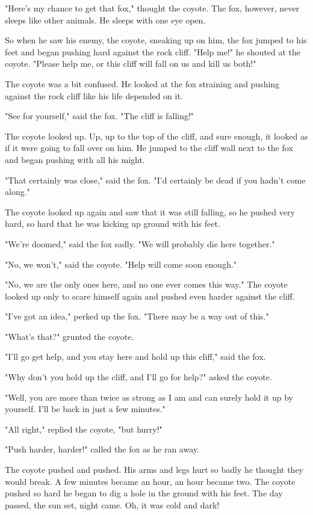 "Here's my chance to get that fox," thought the coyote. The fox, however, never sleeps like other animals. He sleeps with one eye open.

So when he saw his enemy, the coyote, sneaking up on him, the fox jumped to his feet and began pushing hard against the rock cliff. "Help me!" he shouted at the coyote. "Please help me, or this cliff will fall on us and kill us both!"

The coyote was a bit confused. He looked at the fox straining and pushing against the rock cliff like his life depended on it.

"See for yourself," said the fox. "The cliff is falling!"

The coyote looked up. Up, up to the top of the cliff, and sure enough, it looked as if it were going to fall over on him. He jumped to the cliff wall next to the fox and began pushing with all his might.

"That certainly was close," said the fox. "I'd certainly be dead if you hadn't come along."

The coyote looked up again and saw that it was still falling, so he pushed very hard, so hard that he was kicking up ground with his feet.

"We're doomed," said the fox sadly. "We will probably die here together."

"No, we won't," said the coyote. "Help will come soon enough."

"No, we are the only ones here, and no one ever comes this way." The coyote looked up only to scare himself again and pushed even harder against the cliff.

"I've got an idea," perked up the fox. "There may be a way out of this."

"What's that?" grunted the coyote.

"I'll go get help, and you stay here and hold up this cliff," said the fox.

"Why don't you hold up the cliff, and I'll go for help?" asked the coyote.

"Well, you are more than twice as strong as I am and can surely hold it up by yourself. I'll be back in just a few minutes."

"All right," replied the coyote, "but hurry!"

"Push harder, harder!" called the fox as he ran away.

The coyote pushed and pushed. His arms and legs hurt so badly he thought they would break. A few minutes became an hour, an hour became two. The coyote pushed so hard he began to dig a hole in the ground with his feet. The day passed, the sun set, night came. Oh, it was cold and dark!

